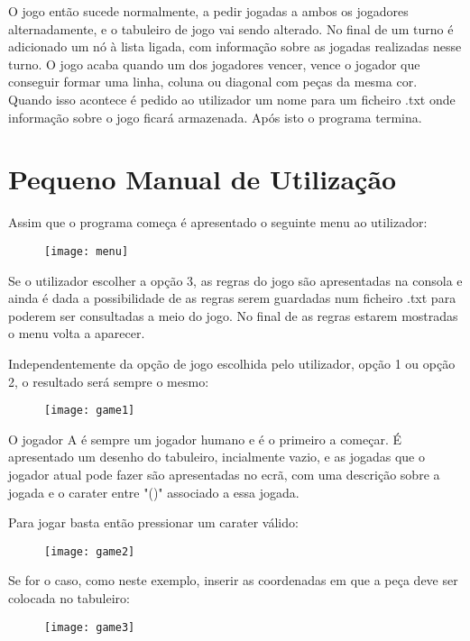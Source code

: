 \documentclass[14pt]{extarticle}
\begin{document}
O jogo então sucede normalmente, a pedir jogadas a ambos os jogadores alternadamente, e o tabuleiro de jogo vai sendo alterado. No final de um turno é adicionado um nó à lista ligada, com informação sobre as jogadas realizadas nesse turno. O jogo acaba quando um dos jogadores vencer, vence o jogador que conseguir formar uma linha, coluna ou diagonal com peças da mesma cor. Quando isso acontece é pedido ao utilizador um nome para um ficheiro .txt onde informação sobre o jogo ficará armazenada. Após isto o programa termina.

\newpage

\section{Pequeno Manual de Utilização}
Assim que o programa começa é apresentado o seguinte menu ao utilizador:
\begin{figure}[h]
    \centering
    \texttt{[image: menu]}
\end{figure}

Se o utilizador escolher a opção 3, as regras do jogo são apresentadas na consola e ainda é dada a possibilidade de as regras serem guardadas num ficheiro .txt para poderem ser consultadas a meio do jogo. No final de as regras estarem mostradas o menu volta a aparecer.

Independentemente da opção de jogo escolhida pelo utilizador, opção 1 ou opção 2, o resultado será sempre o mesmo:
\begin{figure}[h]
    \centering
    \texttt{[image: game1]}
\end{figure}

O jogador A é sempre um jogador humano e é o primeiro a começar. É apresentado um desenho do tabuleiro, incialmente vazio, e as jogadas que o jogador atual pode fazer são apresentadas no ecrã, com uma descrição sobre a jogada e o carater entre "()" associado a essa jogada.

Para jogar basta então pressionar um carater válido:
\begin{figure}[h]
    \centering
    \texttt{[image: game2]}
\end{figure}

Se for o caso, como neste exemplo, inserir as coordenadas em que a peça deve ser colocada no tabuleiro:
\begin{figure}[h]
    \centering
    \texttt{[image: game3]}
\end{figure}
\end{document}
